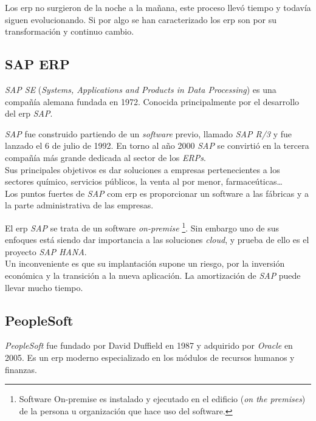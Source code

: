 Los \acrshort{erp} no surgieron de la noche a la mañana, este proceso llevó tiempo y todavía siguen evolucionando. Si por algo se han caracterizado los \acrshort{erp} son por su transformación y continuo cambio.


\subsection{SAP ERP}


\textit{SAP SE} (\textit{Systems, Applications and Products in Data Processing}) es una compañía alemana fundada en 1972. Conocida principalmente por el desarrollo del \acrshort{erp} \textit{SAP}.

\textit{SAP} fue construido partiendo de un \textit{software} previo, llamado \textit{SAP R/3} y fue lanzado el 6 de julio de 1992.
En torno al año 2000 \textit{SAP} se convirtió en la tercera compañía más grande dedicada al sector de los \textit{ERPs}.\\

Sus principales objetivos es dar soluciones a empresas pertenecientes a los sectores químico, servicios públicos, la venta al por menor, farmaceúticas\ldots\\

Los puntos fuertes de \textit{SAP} com \acrshort{erp} es proporcionar un software a las fábricas y a la parte administrativa de las empresas.

El \acrshort{erp} \textit{SAP} se trata de un software \textit{on-premise} \footnote{Software On-premise es instalado y ejecutado en el edificio (\textit{on the premises}) de la persona u organización que hace uso del software.}.
Sin embargo uno de sus enfoques está siendo dar importancia a las soluciones \textit{cloud}, y prueba de ello es el proyecto \textit{SAP HANA}.\\



Un inconveniente es que su implantación supone un riesgo, por la inversión económica y la transición a la nueva aplicación. La amortización de \textit{SAP} puede llevar mucho tiempo.

\subsection{PeopleSoft}
\textit{PeopleSoft} fue fundado por David Duffield en 1987 y adquirido por \textit{Oracle} en 2005. Es un \acrshort{erp} moderno especializado en los módulos de recursos humanos y finanzas.\\

